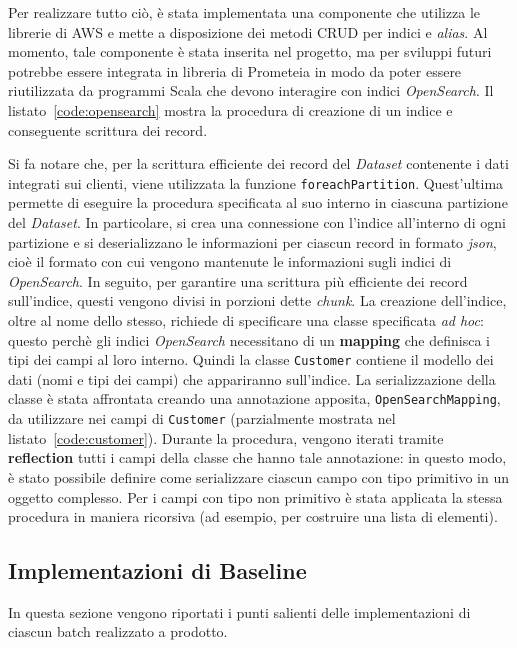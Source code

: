 Per realizzare tutto ciò, è stata implementata una componente che utilizza le librerie di AWS e mette a disposizione dei metodi CRUD per indici e \textit{alias}.
Al momento, tale componente è stata inserita nel progetto, ma per sviluppi futuri potrebbe essere integrata in libreria di Prometeia in modo da poter essere riutilizzata da programmi Scala che devono interagire con indici \textit{OpenSearch}.
Il listato~\ref{code:opensearch} mostra la procedura di creazione di un indice e conseguente scrittura dei record.



Si fa notare che, per la scrittura efficiente dei record del \textit{Dataset} contenente i dati integrati sui clienti, viene utilizzata la funzione \texttt{foreachPartition}.
Quest'ultima permette di eseguire la procedura specificata al suo interno in ciascuna partizione del \textit{Dataset}.
In particolare, si crea una connessione con l'indice all'interno di ogni partizione e si deserializzano le informazioni per ciascun record in formato \textit{json}, cioè il formato con cui vengono mantenute le informazioni sugli indici di \textit{OpenSearch}.
In seguito, per garantire una scrittura più efficiente dei record sull'indice, questi vengono divisi in porzioni dette \textit{chunk}.
La creazione dell'indice, oltre al nome dello stesso, richiede di specificare una classe specificata \textit{ad hoc}:
questo perchè gli indici \textit{OpenSearch} necessitano di un \textbf{mapping} che definisca i tipi dei campi al loro interno.
Quindi la classe \texttt{Customer} contiene il modello dei dati (nomi e tipi dei campi) che appariranno sull'indice.
La serializzazione della classe è stata affrontata creando una annotazione apposita, \texttt{OpenSearchMapping}, da utilizzare nei campi di \texttt{Customer} (parzialmente mostrata nel listato~\ref{code:customer}).
Durante la procedura, vengono iterati tramite \textbf{reflection} tutti i campi della classe che hanno tale annotazione:
in questo modo, è stato possibile definire come serializzare ciascun campo con tipo primitivo in un oggetto complesso.
Per i campi con tipo non primitivo è stata applicata la stessa procedura in maniera ricorsiva (ad esempio, per costruire una lista di elementi).



\subsection{Implementazioni di Baseline}\label{subsec:baseline-implementation}
In questa sezione vengono riportati i punti salienti delle implementazioni di ciascun batch realizzato a prodotto.

